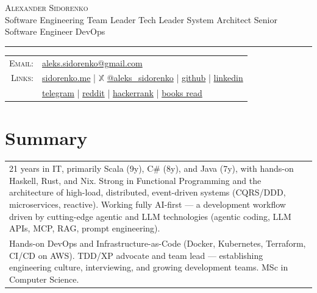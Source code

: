 \documentclass[a4paper,11pt]{article}
\begin{document}
\par{\centering
    {\Huge \textsc{Alexander Sidorenko}}\\[0.45em]
    {\normalsize Software Engineering Team Leader \textbullet{} Tech Leader \textbullet{} System Architect \textbullet{} Senior Software Engineer \textbullet{} DevOps}
  \bigskip\par}

\hrule
\vspace{0.5em}
\begin{tabular}{rl}
  \textsc{Email:} & \faEnvelope{} \href{mailto:aleks.sidorenko@gmail.com}{aleks.sidorenko@gmail.com}\\
  \textsc{Links:} & \faHome{} \href{https://www.sidorenko.me/}{sidorenko.me}
                  | $\mathbb{X}$ \href{https://x.com/aleks_sidorenko}{@aleks\_sidorenko}
                  | \faGithub{} \href{https://github.com/aleks-sidorenko}{github}
                  | \faLinkedin{} \href{https://www.linkedin.com/in/alekssidorenko/}{linkedin}\\
                  & \faPaperPlane{} \href{https://t.me/aleks_sidorenko}{telegram}
                  | \faReddit{} \href{https://www.reddit.com/user/aleks_sidorenko/}{reddit}
                  | \faCode{} \href{https://www.hackerrank.com/aleks_sidorenko}{hackerrank}
                  | \faBook{} \href{https://www.goodreads.com/review/list/41325555-alexander-sidorenko?shelf=read}{books read}\\
\end{tabular}

\section{Summary}
\begin{tabular}{p{}}
21 years in IT, primarily Scala (9y), C\# (8y), and Java (7y), with hands-on Haskell, Rust, and Nix. Strong in Functional Programming and the architecture of high-load, distributed, event-driven systems (CQRS/DDD, microservices, reactive). Working fully AI-first --- a development workflow driven by cutting-edge agentic and LLM technologies (agentic coding, LLM APIs, MCP, RAG, prompt engineering).\\[0.6em]
Hands-on DevOps and Infrastructure-as-Code (Docker, Kubernetes, Terraform, CI/CD on AWS). TDD/XP advocate and team lead --- establishing engineering culture, interviewing, and growing development teams. MSc in Computer Science.
\end{tabular}
\end{document}
